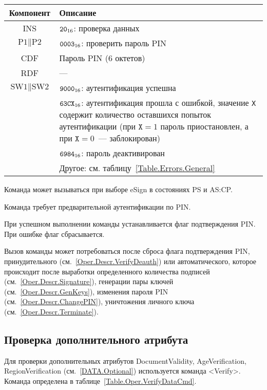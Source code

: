 \begin{table}[hbt]
\caption{}\label{Table.Oper.VerifyPINCmd}
\begin{tabular}{|c|p{14cm}|}
\hline
Компонент & Описание \\
\hline
\hline
INS & $\texttt{20}_{16}$: проверка данных\\
\hline
$\text{P1} \parallel \text{P2}$ & $\texttt{0003}_{16}$: 
проверить пароль PIN\\
\hline
CDF & Пароль PIN (6 октетов)\\
\hline 
\hline
RDF &  --- \\
\hline
$\text{SW1} \parallel \text{SW2}$ & $\texttt{9000}_{16}$: аутентификация успешна\\
\cline{2-2}
 & $\texttt{63CX}_{16}$: аутентификация прошла с ошибкой, 
значение \texttt{X} содержит количество оставшихся попыток аутентификации (при 
$\texttt{X} = 1$ пароль приостановлен, а при $\texttt{X} = 0$~--- 
заблокирован)\\ 
\cline{2-2}
& $\texttt{6984}_{16}$: пароль деактивирован \\
\cline{2-2}
 & Другое: см. таблицу~\ref{Table.Errors.General} \\
\hline
\end{tabular}
\end{table}

Команда может вызываться при выборе eSign в состояниях PS и AS:CP.

Команда требует предварительной аутентификации по PIN.

При успешном выполнении команды устанавливается флаг подтверждения PIN. При 
ошибке флаг сбрасывается. 

Вызов команды может потребоваться после сброса флага подтверждения PIN, 
принудительного (см.~\ref{Oper.Descr.VerifyDeauth}) или автоматического,
которое происходит после выработки определенного количества подписей 
(см.~\ref{Oper.Descr.Signature}), генерации пары ключей 
(см.~\ref{Oper.Descr.GenKeys}), изменения пароля PIN 
(см.~\ref{Oper.Descr.ChangePIN}), уничтожения личного ключа 
(см.~\ref{Oper.Descr.Terminate}). 

\subsection{Проверка дополнительного атрибута}
\label{Oper.Descr.VerifyData}

Для проверки дополнительных атрибутов DocumentValidity, AgeVerification, 
RegionVerification (см.~\ref{DATA.Optional}) используется команда  <Verify>. 
Команда определена в таблице~\ref{Table.Oper.VerifyDataCmd}.

